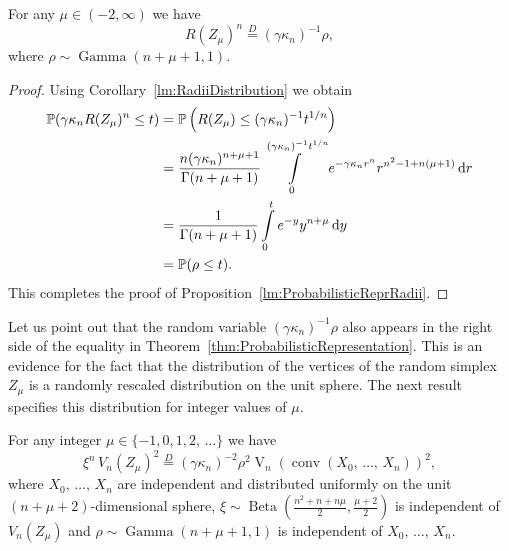 \documentclass[10pt]{amsart}
\theoremstyle{definition}\newtheorem{defi}[theo]{Definition}\newtheorem{rema}[theo]{Remark}\newtheorem{exam}[theo]{Example}\newtheorem{exem}[theo]{Example}\newtheorem{nota}[theo]{Notation}
\newcommand{\PP}{\mathbb{P}}
\newcommand{\dd}{{\rm d}}
\newcommand{\V}{\mathop{\mathrm{V}}\nolimits}
\newcommand{\Gam}{\mathop{\mathrm{Gamma}}\nolimits}
\newcommand{\Bet}{\mathop{\mathrm{Beta}}\nolimits}
\newcommand{\eqdistr}{\stackrel{D}{=}}
\newcommand{\conv}{\mathop{\mathrm{conv}}\nolimits}
\begin{document}
\begin{prop}\label{lm:ProbabilisticReprRadii}
For any $\mu\in(-2,\infty)$ we have
\[
R(Z_{\mu})^n\eqdistr (\gamma\kappa_n)^{-1}\rho,
\]
where $\rho\sim\Gam(n+\mu+1,1)$.
\end{prop}
\begin{proof}
Using Corollary~\ref{lm:RadiiDistribution} we obtain
\begin{align*}
\PP(\gamma\kappa_nR(Z_\mu)^n\leq t)&=\PP\left(R(Z_\mu)\leq (\gamma\kappa_n)^{-1}t^{1/n}\right)\\
&=\frac{n(\gamma\kappa_n)^{n+\mu+1}}{\Gamma(n+\mu+1)}\int\limits_{0}^{(\gamma\kappa_n)^{-1}t^{1/n}}e^{-\gamma\kappa_nr^n}r^{n^2-1+n(\mu+1)}\,\dd r\\
&=\frac{1}{\Gamma(n+\mu+1)}\int\limits_{0}^{t}e^{-y}y^{n+\mu}\,\dd y\\
&=\PP(\rho\leq t).
\end{align*}
This completes the proof of Proposition~\ref{lm:ProbabilisticReprRadii}.
\end{proof}

Let us point out that the random variable $(\gamma\kappa_n)^{-1}\rho$ also appears in the right side of the equality in Theorem~\ref{thm:ProbabilisticRepresentation}. This is an evidence for the fact that the distribution of the vertices of the random simplex $Z_{\mu}$ is a randomly rescaled distribution on the unit sphere. The next result specifies this distribution for integer values of $\mu$.

\begin{prop}\label{prop2.8}
For any integer $\mu\in\{-1,0,1,2,\,\ldots\}$ we have
\[
\xi^{n}\,V_n(Z_{\mu})^2\eqdistr (\gamma\kappa_n)^{-2}\rho^{2}\V_n\left(\conv(X_0,\,\ldots,\,X_n)\right)^2,
\]
where $X_0,\,\ldots,\,X_n$ are independent and distributed uniformly on the unit $(n+\mu+2)$-dimensional sphere, $\xi\sim\Bet(\frac{n^2+n+n\mu}{2}, \frac{\mu+2}{2})$ is independent of $V_n(Z_{\mu})$ and $\rho\sim\Gam(n+\mu+1,1)$ is independent of $X_0,\,\ldots,\,X_n$.
\end{prop}
\end{document}
